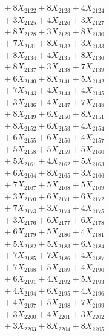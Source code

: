 \documentclass[a4paper,10pt]{article}
\begin{document}
{\begin{align}
&\;  + 8 X_{2122} + 8 X_{2123} + 4 X_{2124} \\[0.3ex]
&\;  + 3 X_{2125} + 4 X_{2126} + 3 X_{2127} \\[0.3ex]
&\;  + 8 X_{2128} + 3 X_{2129} + 8 X_{2130} \\[0.3ex]
&\;  + 7 X_{2131} + 8 X_{2132} + 3 X_{2133} \\[0.3ex]
&\;  + 8 X_{2134} + 4 X_{2135} + 8 X_{2136} \\[0.3ex]
&\;  + 8 X_{2137} + 3 X_{2138} + 7 X_{2139} \\[0.5ex]\allowbreak
&\;  + 6 X_{2140} + 8 X_{2141} + 5 X_{2142} \\[0.3ex]
&\;  + 7 X_{2143} + 4 X_{2144} + 4 X_{2145} \\[0.3ex]
&\;  + 3 X_{2146} + 4 X_{2147} + 7 X_{2148} \\[0.3ex]
&\;  + 8 X_{2149} + 6 X_{2150} + 8 X_{2151} \\[0.3ex]
&\;  + 8 X_{2152} + 6 X_{2153} + 4 X_{2154} \\[0.3ex]
&\;  + 6 X_{2155} + 6 X_{2156} + 4 X_{2157} \\[0.3ex]
&\;  + 5 X_{2158} + 5 X_{2159} + 5 X_{2160} \\[0.3ex]
&\;  + 5 X_{2161} + 4 X_{2162} + 5 X_{2163} \\[0.3ex]
&\;  + 6 X_{2164} + 8 X_{2165} + 3 X_{2166} \\[0.3ex]
&\;  + 7 X_{2167} + 5 X_{2168} + 5 X_{2169} \\[0.5ex]\allowbreak
&\;  + 3 X_{2170} + 6 X_{2171} + 6 X_{2172} \\[0.3ex]
&\;  + 7 X_{2173} + 3 X_{2174} + 4 X_{2175} \\[0.3ex]
&\;  + 3 X_{2176} + 6 X_{2177} + 6 X_{2178} \\[0.3ex]
&\;  + 6 X_{2179} + 5 X_{2180} + 4 X_{2181} \\[0.3ex]
&\;  + 5 X_{2182} + 5 X_{2183} + 6 X_{2184} \\[0.3ex]
&\;  + 7 X_{2185} + 7 X_{2186} + 4 X_{2187} \\[0.3ex]
&\;  + 7 X_{2188} + 5 X_{2189} + 4 X_{2190} \\[0.3ex]
&\;  + 6 X_{2191} + 4 X_{2192} + 5 X_{2193} \\[0.3ex]
&\;  + 4 X_{2194} + 6 X_{2195} + 4 X_{2196} \\[0.3ex]
&\;  + 4 X_{2197} + 5 X_{2198} + 7 X_{2199} \\[0.5ex]\allowbreak
&\;  + 3 X_{2200} + 4 X_{2201} + 3 X_{2202} \\[0.3ex]
&\;  + 3 X_{2203} + 8 X_{2204} + 8 X_{2205} \\[0.3ex]

\end{align}}
\end{document}
